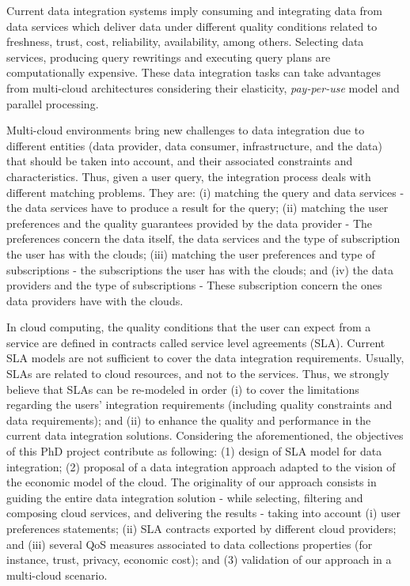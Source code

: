 Current data integration systems imply consuming and integrating data from data services which deliver data under different quality conditions related to freshness, trust, cost, reliability, availability, among others. Selecting data services, producing query rewritings and executing query plans are computationally expensive. These data integration tasks can take advantages from multi-cloud architectures considering their elasticity, \textit{pay-per-use} model and parallel processing.

Multi-cloud environments bring new challenges to data integration due to different entities (data provider, data consumer, infrastructure, and the data) that should be taken into account, and their associated constraints and characteristics. Thus, given a user query, the integration process deals with different matching problems. They are: (i) matching the query and data services - the data services have to produce a result for the query; (ii) matching the user preferences and the quality guarantees provided by the data provider - The preferences concern the data itself, the data services and the type of subscription the user has with the clouds; (iii) matching the user preferences and type of subscriptions - the subscriptions the user has with the clouds; and (iv) the data providers and the type of subscriptions - These subscription concern the ones data providers have with the clouds.

In cloud computing, the quality conditions that the user can expect from a service are defined in contracts called service level agreements (SLA). Current SLA models are not sufficient to cover the data integration requirements. Usually, SLAs are related to cloud resources, and not to the services. Thus, we strongly believe that SLAs can be re-modeled in order (i) to cover the limitations regarding the users' integration requirements (including quality constraints and data requirements); and (ii) to enhance the quality and performance in the current data integration solutions. 
Considering the aforementioned, the objectives of this PhD project contribute as following: (1) design of SLA model for data integration; (2) proposal of a data integration approach adapted to the vision of the economic model of the cloud. The originality of our approach consists in guiding the entire data integration solution - while selecting, filtering and composing cloud services, and delivering the results - taking into account (i) user preferences statements; (ii) SLA contracts exported by different cloud providers; and (iii) several QoS measures associated to data collections properties (for instance, trust, privacy, economic cost); and (3) validation of our approach in a multi-cloud scenario.
